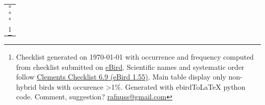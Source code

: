 \documentclass{article}
\begin{document}
\begin{center}
\begin{tabularx}{\textwidth}{c}
$\square$\hspace{1ex}  \\ 
$\square$\hspace{1ex}  \\ 
$\square$\hspace{1ex}  \\ 
\hline
\let\thefootnote\relax\footnote{
Checklist generated on \today{}  with occurrence and frequency computed from checklist submitted on \href{www.ebird.org}{eBird}. Scientific names and systematic order follow \href{http://www.birds.cornell.edu/clementschecklist/download/}{Clements Checklist 6.9 (eBird 1.55)}.
Main table display only non-hybrid birds with occurence >1\%.
 Generated with ebirdToLaTeX python code. Comment, suggestion? \href{mailto:rafnuss@gmail.com}{rafnuss@gmail.com}}
\end{tabularx}


\end{center}
\end{document}
